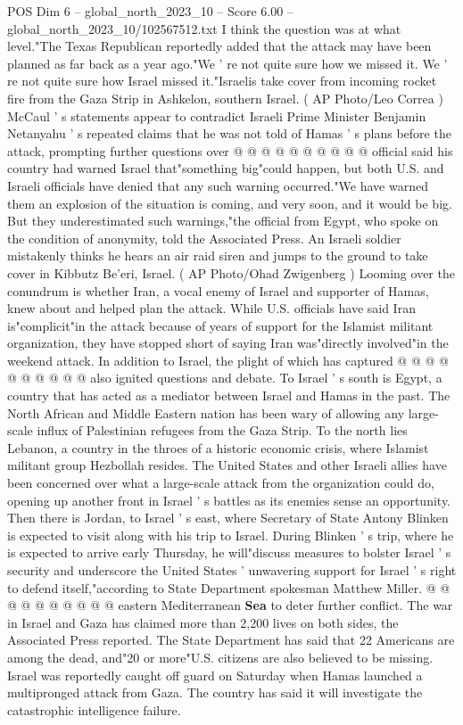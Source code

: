 \begin{textsample}{POS Dim 6 – global\_north\_2023\_10 – Score 6.00 – global\_north\_2023\_10/102567512.txt}
I think the question was at what level."The Texas Republican reportedly added that the attack may have been planned as far back as a year ago."We ' re not quite sure how we missed it.
We ' re not quite sure how Israel missed it."Israelis take cover from incoming rocket fire from the Gaza Strip in Ashkelon, southern Israel. ( AP Photo/Leo Correa ) McCaul ' s statements appear to contradict Israeli Prime Minister Benjamin Netanyahu ' s repeated claims that he was not told of Hamas ' s plans before the attack, prompting further questions over @ @ @ @ @ @ @ @ @ @ official said his country had warned Israel that"something big"could happen, but both U.S. and Israeli officials have denied that any such warning occurred."We have warned them an explosion of the situation is coming, and very soon, and it would be big.
But they underestimated such warnings,"the official from Egypt, who spoke on the condition of anonymity, told the Associated Press.
An Israeli soldier mistakenly thinks he hears an air raid siren and jumps to the ground to take cover in Kibbutz Be'eri, Israel. ( AP Photo/Ohad Zwigenberg ) Looming over the conundrum is whether Iran, a vocal enemy of Israel and supporter of Hamas, knew about and helped plan the attack.
While U.S. officials have said Iran is"complicit"in the attack because of years of support for the Islamist militant organization, they have stopped short of saying Iran was"directly involved"in the weekend attack.
In addition to Israel, the plight of which has captured @ @ @ @ @ @ @ @ @ @ also ignited questions and debate.
To Israel ' s south is Egypt, a country that has acted as a mediator between Israel and Hamas in the past.
The North African and Middle Eastern nation has been wary of allowing any large-scale influx of Palestinian refugees from the Gaza Strip.
To the north lies Lebanon, a country in the throes of a historic economic crisis, where Islamist militant group Hezbollah resides.
The United States and other Israeli allies have been concerned over what a large-scale attack from the organization could do, opening up another front in Israel ' s battles as its enemies sense an opportunity.
Then there is Jordan, to Israel ' s east, where Secretary of State Antony Blinken is expected to visit along with his trip to Israel.
During Blinken ' s trip, where he is expected to arrive early Thursday, he will"discuss measures to bolster Israel ' s security and underscore the United States ' unwavering support for Israel ' s right to defend itself,"according to State Department spokesman Matthew Miller. @ @ @ @ @ @ @ @ @ @ eastern Mediterranean \textbf{Sea} to deter further conflict.
The war in Israel and Gaza has claimed more than 2,200 lives on both sides, the Associated Press reported.
The State Department has said that 22 Americans are among the dead, and"20 or more"U.S. citizens are also believed to be missing.
Israel was reportedly caught off guard on Saturday when Hamas launched a multipronged attack from Gaza.
The country has said it will investigate the catastrophic intelligence failure.

\end{textsample}
